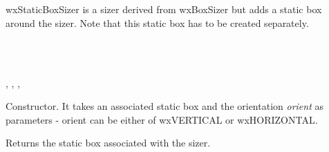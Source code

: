 \section{}\label{wxstaticboxsizer}

wxStaticBoxSizer is a sizer derived from wxBoxSizer but adds a static
box around the sizer. Note that this static box has to be created 
separately.


\\
\\


, , , 


\label{wxstaticboxsizerwxstaticboxsizer}


Constructor. It takes an associated static box and the orientation {\it orient} 
as parameters - orient can be either of wxVERTICAL or wxHORIZONTAL.

\label{wxstaticboxsizergetstaticbox}


Returns the static box associated with the sizer.

